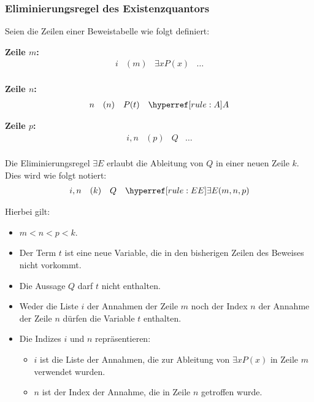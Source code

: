 \documentclass[main.tex]{subfiles}
\begin{document}
\subsubsection{Eliminierungsregel des Existenzquantors}
\label{rule:EE}
\begin{definition}
Seien die Zeilen einer Beweistabelle wie folgt definiert:

\textbf{Zeile \(m\):}
\[
\begin{array}{llll}
    i & (m) & \exists x P(x) & \dots \\
\end{array}
\]

\textbf{Zeile \(n\):}
\[
\begin{array}{llll}
    n & (n) & P(t) & \rA \\
\end{array}
\]

\textbf{Zeile \(p\):}
\[
\begin{array}{llll}
    i,n & (p) & Q & \dots \\
\end{array}
\]

Die Eliminierungsregel \(\exists E\) erlaubt die Ableitung von \(Q\) in einer neuen Zeile \(k\). Dies wird wie folgt notiert:
\[
\begin{array}{llll}
    i,n & (k) & Q & \rEE{m,n,p} \\
\end{array}
\]

Hierbei gilt:
\begin{itemize}
    \item \(m < n < p < k\).
    \item Der Term \(t\) ist eine neue Variable, die in den bisherigen Zeilen des Beweises nicht vorkommt.
    \item Die Aussage \(Q\) darf \(t\) nicht enthalten.
    \item Weder die Liste \(i\) der Annahmen der Zeile \(m\) noch der Index \(n\) der Annahme der Zeile \(n\) dürfen die Variable \(t\) enthalten.
    \item Die Indizes \(i\) und \(n\) repräsentieren:
    \begin{itemize}
        \item \(i\) ist die Liste der Annahmen, die zur Ableitung von \(\exists x P(x)\) in Zeile \(m\) verwendet wurden.
        \item \(n\) ist der Index der Annahme, die in Zeile \(n\) getroffen wurde.
    \end{itemize}
\end{itemize}
\end{definition}
\end{document}
